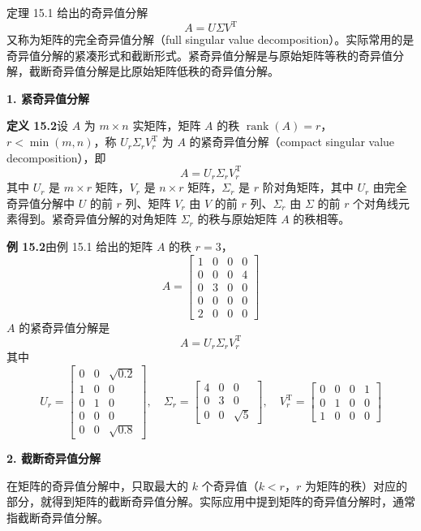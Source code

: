 \documentclass[UTF8,12pt,a4paper,fontset=fandol]{ctexart}
\begin{document}
定理 15.1 给出的奇异值分解
\[
A=U\Sigma V^{\mathrm{T}}
\]
又称为矩阵的完全奇异值分解（full singular value decomposition）。实际常用的是奇异值分解的紧凑形式和截断形式。紧奇异值分解是与原始矩阵等秩的奇异值分解，截断奇异值分解是比原始矩阵低秩的奇异值分解。

\noindent\textbf{1. 紧奇异值分解}

\noindent\textbf{定义 15.2}\quad 设 $A$ 为 $m\times n$ 实矩阵，矩阵 $A$ 的秩 $\operatorname{rank}(A)=r$，$r<\min(m,n)$，称 $U_r\Sigma_rV_r^{\mathrm{T}}$ 为 $A$ 的紧奇异值分解（compact singular value decomposition），即
\begin{equation}
A=U_r\Sigma_rV_r^{\mathrm{T}}
\tag{15.18}
\end{equation}
其中 $U_r$ 是 $m\times r$ 矩阵，$V_r$ 是 $n\times r$ 矩阵，$\Sigma_r$ 是 $r$ 阶对角矩阵，其中 $U_r$ 由完全奇异值分解中 $U$ 的前 $r$ 列、矩阵 $V_r$ 由 $V$ 的前 $r$ 列、$\Sigma_r$ 由 $\Sigma$ 的前 $r$ 个对角线元素得到。紧奇异值分解的对角矩阵 $\Sigma_r$ 的秩与原始矩阵 $A$ 的秩相等。

\noindent\textbf{例 15.2}\quad 由例 15.1 给出的矩阵 $A$ 的秩 $r=3$，
\[
A=
\begin{bmatrix}
1&0&0&0\\
0&0&0&4\\
0&3&0&0\\
0&0&0&0\\
2&0&0&0
\end{bmatrix}
\]
$A$ 的紧奇异值分解是
\[
A=U_r\Sigma_rV_r^{\mathrm{T}}
\]
其中
\[
U_r=
\begin{bmatrix}
0&0&\sqrt{0.2}\\
1&0&0\\
0&1&0\\
0&0&0\\
0&0&\sqrt{0.8}
\end{bmatrix},
\quad
\Sigma_r=
\begin{bmatrix}
4&0&0\\
0&3&0\\
0&0&\sqrt5
\end{bmatrix},
\quad
V_r^{\mathrm{T}}=
\begin{bmatrix}
0&0&0&1\\
0&1&0&0\\
1&0&0&0
\end{bmatrix}
\]

\noindent\textbf{2. 截断奇异值分解}

在矩阵的奇异值分解中，只取最大的 $k$ 个奇异值（$k<r$，$r$ 为矩阵的秩）对应的部分，就得到矩阵的截断奇异值分解。实际应用中提到矩阵的奇异值分解时，通常指截断奇异值分解。
\end{document}
